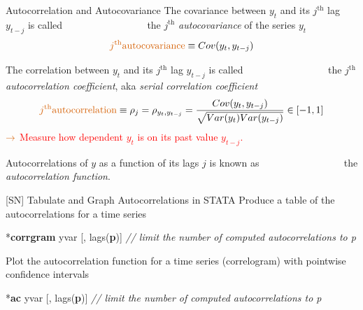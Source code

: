 \documentclass[
  10pt,
  ignorenonframetext,
]{beamer}
\newenvironment{Shaded}{\begin{snugshade}}{\end{snugshade}}
\newcommand{\CommentTok}[1]{\textcolor[rgb]{0.56,0.35,0.01}{\textit{#1}}}
\newcommand{\KeywordTok}[1]{\textcolor[rgb]{0.13,0.29,0.53}{\textbf{#1}}}
\newcommand{\NormalTok}[1]{#1}
\begin{document}
\begin{frame}{Autocorrelation and Autocovariance}
\protect\hypertarget{Autocorr}{}
The covariance between \(y_t\) and its \(j^{\text{th}}\) lag \(y_{t-j}\)
is called \(\qquad \qquad \qquad \qquad\) the \(j^{\text{th}}\)
\emph{autocovariance} of the series \(y_t\)\small \[
{\color{red}{j^{\text{th}} \text{autocovariance}}} \equiv Cov(y_t,y_{t-j})
\]

\vspace{2mm}

\normalsize The correlation between \(y_t\) and its \(j^{\text{th}}\)
lag \(y_{t-j}\) is called \(\qquad \qquad \qquad \qquad\) the
\(j^{\text{th}}\) \emph{autocorrelation coefficient}, aka \emph{serial
correlation coefficient}\small \[
{\color{red}{j^{\text{th}} \text{autocorrelation}}} \equiv \rho_j = \rho_{y_t,y_{t-j}} = \frac{Cov(y_t,y_{t-j})}{\sqrt{Var(y_t)Var(y_{t-j})}} \in[-1,1]
\] \(\color{red}{\rightarrow}\)
\textcolor{red}{Measure how dependent $y_t$ is on its past value $y_{t-j}$.}

\vspace{2mm}

\normalsize Autocorrelations of \(y\) as a function of its lags \(j\) is
known as \(\qquad \qquad \qquad \qquad\) the \emph{autocorrelation
function}.
\end{frame}

\begin{frame}[fragile]{{[}SN{]} Tabulate and Graph Autocorrelations in
STATA}
\protect\hypertarget{sn-tabulate-and-graph-autocorrelations-in-stata}{}
Produce a table of the autocorrelations for a time series \small

\begin{Shaded}
\begin{Highlighting}[]
\NormalTok{*}\KeywordTok{corrgram}\NormalTok{ yvar [, lags(}\KeywordTok{p}\NormalTok{)]}
\CommentTok{// limit the number of computed autocorrelations to p}
\end{Highlighting}
\end{Shaded}

\normalsize

Plot the autocorrelation function for a time series (correlogram) with
pointwise confidence intervals \small

\begin{Shaded}
\begin{Highlighting}[]
\NormalTok{*}\KeywordTok{ac}\NormalTok{ yvar [, lags(}\KeywordTok{p}\NormalTok{)]}
\CommentTok{// limit the number of computed autocorrelations to p}
\end{Highlighting}
\end{Shaded}
\end{frame}
\end{document}
